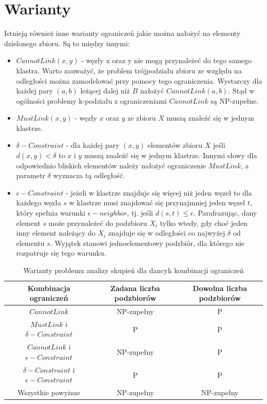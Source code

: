 \documentclass[10pt,a4paper]{article}
\begin{document}
\section{Warianty}\label{sec:warianty}
\par
Istnieją również inne warianty ograniczeń jakie można nałożyć na elementy dzielonego zbioru.
Są to między innymi:
\begin{itemize}
  \item $CannotLink(x, y)$ - węzły x oraz y nie mogą przynależeć do tego samego klastra. Warto zauważyć, że
        problem trójpodziału zbioru ze względu na odległości można zamodelować przy pomocy tego ograniczenia.
        Wystarczy dla każdej pary $(a, b)$ leżącej dalej niż $B$ nałożyć $CannotLink(a, b)$. Stąd w ogólności
        problemy k-podziału z ograniczeniami $CannotLink$ są NP-zupełne.
	\item $MustLink(x, y)$ - węzły $x$ oraz $y$ ze zbioru $X$ muszą znaleźć się w jednym klastrze.
  \item $\delta-Constraint$ - dla każdej pary $(x,y)$ elementów zbioru $X$ jeśli $d(x,y) < \delta$ to $x$ i $y$ muszą
        znaleźć się w jednym klastrze. Innymi słowy dla odpowiednio bliskich elementów należy nałożyć ograniczenie
        $MustLink$, a parametr $\delta$ wyznacza tą odległość.
  \item $\epsilon-Constraint$ - jeżeli w klastrze znajduje się więcej niż jeden węzeł to dla każdego węzła $s$ w klastrze
        musi znajdować się przynajmniej jeden węzeł $t$, który spełnia warunki $\epsilon-neighbor$, tj.
        jeśli $d(s,t) \leq \epsilon$. Parafrazując, dany element $s$ może przynależeć do podzbioru $X_i$ tylko wtedy,
        gdy choć jeden inny element należący do $X_i$ znajduje się w odległości co najwyżej $\delta$ od elementu $s$.
        Wyjątek stanowi jednoelementowy podzbiór, dla którego nie rozpatruje się tego warunku.
\end{itemize}

\begin{table}
\caption{Warianty problemu analizy skupień dla dancyh kombinacji ograniczeń}
\begin{tabular}{|| c | c | c ||}
    \hline\hline
  Kombinacja ograniczeń & Zadana liczba podzbiorów & Dowolna liczba podzbiorów \\
    \hline\hline
  $CannotLink$ & NP-zupełny & P \\
    \hline
  $MustLink$ i $\delta -Constraint$ & P & P \\
    \hline 
  $CannotLink$ i $\epsilon -Constraint$ & NP-zupełny & P \\
    \hline 
  $\delta -Constraint$ i $\epsilon -Constraint$ & P & P \\
    \hline 
  Wszystkie powyższe & NP-zupełny & NP-zupełny \\
    \hline\hline
\end{tabular} 
\end{table}
\end{document}
